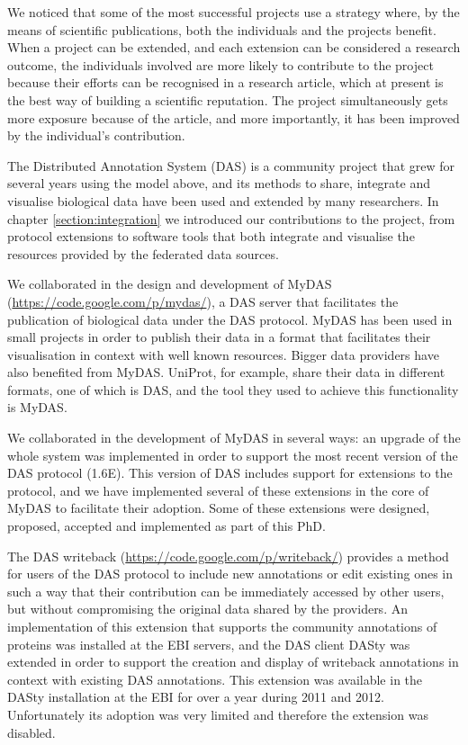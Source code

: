We noticed that some of the most successful projects use a strategy where, by the means of scientific publications, both the individuals and the projects  benefit. When a project can be extended, and each extension can be considered a research outcome, the individuals involved are more likely to contribute to the project because their efforts can be recognised in a research article, which at present is the best way of building a scientific reputation. The project simultaneously gets more exposure because of the article, and more importantly, it has been improved by the individual's contribution.

\vspace{5mm}

The Distributed Annotation System (DAS) is a community project that grew for several years using the model above, and its methods to share, integrate and visualise biological data have been used and extended by many researchers. In chapter \ref{section:integration} we introduced our contributions to the project, from protocol extensions to software tools that both integrate and visualise the resources provided by the federated data sources.

We collaborated in the design and development of MyDAS (\url{https://code.google.com/p/mydas/}), a DAS server that facilitates the publication of biological data under the DAS protocol. MyDAS has been used in small projects in order to publish their data in a format that facilitates their visualisation in context with well known resources. Bigger data providers have also benefited from MyDAS. UniProt, for example, share their data in different formats, one of which is DAS, and the tool they used to achieve this functionality is MyDAS.

We collaborated in the development of MyDAS in several ways: an upgrade of the whole system was implemented in order to support the most recent version of the DAS protocol (1.6E). This version of DAS includes support for extensions to the protocol, and we have implemented several of these extensions in the core of MyDAS to facilitate their adoption. Some of these extensions were designed, proposed, accepted and implemented as part of this PhD. 

The DAS writeback (\url{https://code.google.com/p/writeback/}) provides a method for users of the DAS protocol to include new annotations or edit existing ones in such a way that their contribution can be immediately accessed by other users, but without compromising the original data shared by the providers. An implementation of this extension that supports the community annotations of proteins was installed at the EBI servers, and the DAS client DASty was extended in order to support the creation and display of writeback annotations in context with existing DAS annotations. This extension was available in the DASty installation at the EBI for over a year during 2011 and 2012. Unfortunately its adoption was very limited and therefore the extension was disabled.

